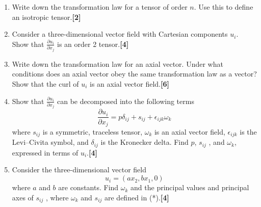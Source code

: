 \documentclass[a4paper]{article}
\begin{document}
\newpage
\begin{qns}[Tensors]\leavevmode
\begin{enumerate}[label=(\roman*)]
\item Write down the transformation law for a tensor of order $n$. Use this to define an isotropic tensor.\hfill\textbf{[2]}
\item Consider a three-dimensional vector field with Cartesian components $u_i$. Show that $\frac{\partial u_i}{\partial x_j}$ is an order 2 tensor.\hfill\textbf{[4]}
\item  Write down the transformation law for an axial vector. Under what conditions does an axial vector obey the same transformation law as a vector? Show that the curl of $u_i$ is an axial vector field.\hfill\textbf{[6]}
\item Show that $\frac{\partial u_i}{\partial x_j}$ can be decomposed into the following terms
\begin{equation}
    \frac{\partial u_i}{\partial x_j}=p\delta_{ij}+s_{ij}+\epsilon_{ijk}\omega_k\tag{*}
\end{equation}
where $s_{ij}$ is a symmetric, traceless tensor, $\omega_k$ is an axial vector field, $\epsilon_{ijk}$ is the Levi–Civita symbol, and $\delta_{ij}$ is the Kronecker delta. Find $p$, $s_{ij}$ , and $\omega_k$, expressed in terms of $u_i$.\hfill\textbf{[4]}
\item Consider the three-dimensional vector field
$$u_i=(ax_2,bx_1,0)$$
where $a$ and $b$ are constants. Find $\omega_k$ and the principal values and principal axes of $s_{ij}$ , where $\omega_k$ and $s_{ij}$ are defined in (*).\hfill\textbf{[4]}
\end{enumerate}
\end{qns}
\end{document}
